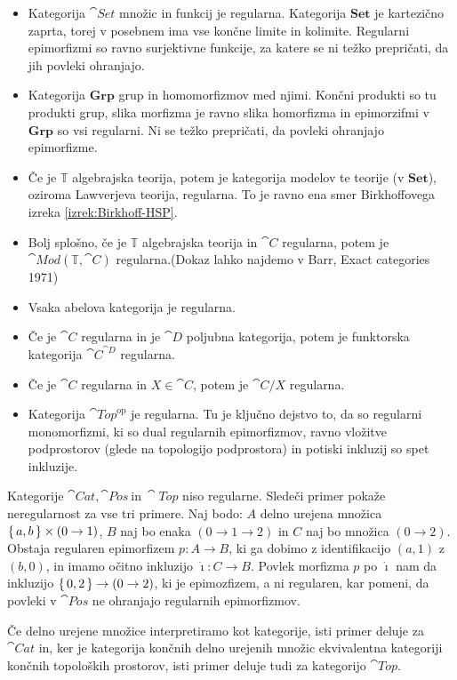\documentclass[../kategoricna_logika.tex]{subfiles}
\begin{document}
\begin{primer}
  \hfill
  \begin{itemize}
  \item Kategorija $\cat{Set}$ množic in funkcij je regularna. Kategorija $\mathbf{Set}$ je
    kartezično zaprta, torej v posebnem ima vse končne limite in kolimite.
    Regularni epimorfizmi so ravno surjektivne funkcije, za katere se ni
    težko prepričati, da jih povleki ohranjajo.
  \item Kategorija $\mathbf{Grp}$ grup in homomorfizmov med njimi.
    Končni produkti so tu produkti grup, slika morfizma je ravno slika homorfizma
    in epimorzifmi v $\mathbf{Grp}$ so vsi regularni. Ni se težko prepričati,
    da povleki ohranjajo epimorfizme.
  \item Če je $\mathbb{T}$ algebrajska teorija, potem je kategorija modelov 
    te teorije (v $\mathbf{Set}$), oziroma Lawverjeva teorija, regularna.
    To je ravno ena smer Birkhoffovega izreka \ref{izrek:Birkhoff-HSP}.
  \item Bolj splošno, če je $\mathbb{T}$ algebrajska teorija in
    $\cat{C}$ regularna, potem je $\cat{Mod}(\mathbb{T}, \cat{C})$
    regularna.(Dokaz lahko najdemo v Barr, Exact categories 1971)
  \item Vsaka abelova kategorija je regularna.
  \item Če je $\cat{C}$ regularna in je $\cat{D}$ poljubna kategorija,
    potem je funktorska kategorija $\cat{C}^{\cat{D}}$ regularna.
  \item Če je $\cat{C}$ regularna in $X \in \cat{C}$, potem je
    $\cat{C}/X$ regularna.
  \item Kategorija $\cat{Top}^{\mathrm{op}}$ je regularna. Tu je ključno dejstvo to,
    da so regularni monomorfizmi, ki so dual regularnih epimorfizmov, ravno
    vložitve podprostorov (glede na topologijo podprostora) in potiski inkluzij
    so spet inkluzije.
  \end{itemize}
\end{primer}
\begin{primer}
  Kategorije $\cat{Cat}, \cat{Pos}\ \text{in}\ \cat{Top}$ niso
  regularne.  Sledeči primer pokaže neregularnost za vse tri primere.
  Naj bodo: $A$ delno urejena množica $\left\lbrace\,a, b\,\right\rbrace \times (0 \to 1)$,
  $B$ naj bo enaka $(0 \to 1 \to 2)$ in $C$ naj bo
  množica $(0 \to 2)$.  Obstaja regularen epimorfizem ${p : A \to B}$,
  ki ga dobimo z identifikacijo $(a,1)$ z $(b, 0)$, in imamo očitno
  inkluzijo ${\dot{\imath} : C \to B}$. Povlek morfizma $p$ po
  $\dot{\imath}$ nam da inkluzijo $\left\lbrace\,0, 2\,\right\rbrace \to (0 \to 2)$, ki je
  epimozfizem, a ni regularen, kar pomeni, da povleki v $\cat{Pos}$ ne
  ohranjajo regularnih epimorfizmov.

  Če delno urejene množice interpretiramo kot kategorije, isti primer
  deluje za $\cat{Cat}$ in, ker je kategorija končnih delno urejenih
  množic ekvivalentna kategoriji končnih topoloških prostorov, isti
  primer deluje tudi za kategorijo $\cat{Top}$.
\end{primer}
\end{document}
